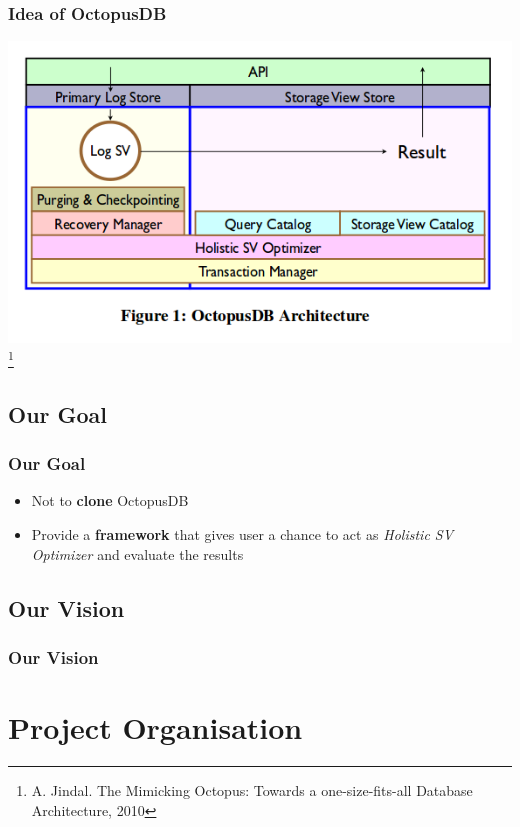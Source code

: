 \documentclass{beamer}
\begin{document}
\begin{frame}
\frametitle{Idea of OctopusDB}
\includegraphics[scale=0.5]{img/octopus_arch.png}
\footnote{A. Jindal. The Mimicking Octopus: Towards a one-size-fits-all Database Architecture, 2010}
\end{frame}

\subsection{Our Goal}
\begin{frame}
\frametitle{Our Goal}
\begin{itemize}
\item{Not to \textbf{clone} OctopusDB} \pause
\item{Provide a \textbf{framework} that gives user a chance to act as \textit{Holistic SV Optimizer} and evaluate the results}
\end{itemize}
\end{frame}

\subsection{Our Vision}
\begin{frame}
\frametitle{Our Vision}
\end{frame}

\section{Project Organisation}
\end{document}
